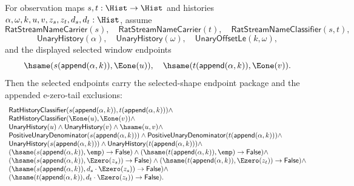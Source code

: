 \begin{theorem}
\label{thm:real-unary-streamname-finite-window-selected-classifier-appended-tail-package}
For observation maps $s,t:\Hist\to\Hist$ and histories
$\alpha,\omega,k,u,v,z_s,z_t,d_s,d_t:\Hist$, assume
$$
\mathsf{RatStreamNameCarrier}(s),\quad
\mathsf{RatStreamNameCarrier}(t),\quad
\mathsf{RatStreamNameClassifier}(s,t),
$$
$$
\mathsf{UnaryHistory}(\alpha),\quad
\mathsf{UnaryHistory}(\omega),\quad
\mathsf{UnaryOffsetLe}(k,\omega),
$$
and the displayed selected window endpoints
$$
\hsame(s(\mathsf{append}(\alpha,k)),\Eone(u)),
\quad
\hsame(t(\mathsf{append}(\alpha,k)),\Eone(v)).
$$
Then the selected endpoints carry the selected-shape endpoint package and the
appended e-zero-tail exclusions:
$$
\begin{array}{l}
\mathsf{RatHistoryClassifier}(s(\mathsf{append}(\alpha,k)),t(\mathsf{append}(\alpha,k)))\land\\
\mathsf{RatHistoryClassifier}(\Eone(u),\Eone(v))\land\\
\mathsf{UnaryHistory}(u)\land\mathsf{UnaryHistory}(v)\land\hsame(u,v)\land\\
\mathsf{PositiveUnaryDenominator}(s(\mathsf{append}(\alpha,k)))\land
\mathsf{PositiveUnaryDenominator}(t(\mathsf{append}(\alpha,k)))\land\\
\mathsf{UnaryHistory}(s(\mathsf{append}(\alpha,k)))\land
\mathsf{UnaryHistory}(t(\mathsf{append}(\alpha,k)))\land\\
(\hsame(s(\mathsf{append}(\alpha,k)),\emp)\to\mathsf{False})\land
(\hsame(t(\mathsf{append}(\alpha,k)),\emp)\to\mathsf{False})\land\\
(\hsame(s(\mathsf{append}(\alpha,k)),\Ezero(z_s))\to\mathsf{False})\land
(\hsame(t(\mathsf{append}(\alpha,k)),\Ezero(z_t))\to\mathsf{False})\land\\
(\hsame(s(\mathsf{append}(\alpha,k)),d_s\cdot\Ezero(z_s))\to
\mathsf{False})\land\\
(\hsame(t(\mathsf{append}(\alpha,k)),d_t\cdot\Ezero(z_t))\to
\mathsf{False}).
\end{array}
$$
\end{theorem}
